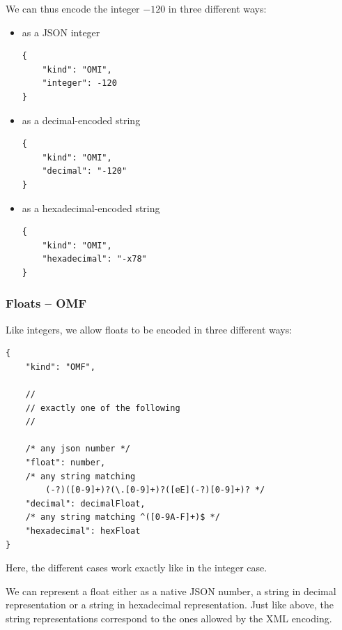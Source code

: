 We can thus encode the integer $-120$ in three different ways:
\begin{itemize}
    \item as a JSON integer
\\\begin{minipage}{\linewidth}\begin{lstlisting}
{
    "kind": "OMI",
    "integer": -120
}
\end{lstlisting}\end{minipage}
    \item as a decimal-encoded string
\\\begin{minipage}{\linewidth}\begin{lstlisting}
{
    "kind": "OMI",
    "decimal": "-120"
}
\end{lstlisting}\end{minipage}
    \item as a hexadecimal-encoded string
\\\begin{minipage}{\linewidth}\begin{lstlisting}
{
    "kind": "OMI",
    "hexadecimal": "-x78"
}
\end{lstlisting}\end{minipage}
\end{itemize}

\subsubsection{Floats -- OMF}

Like integers, we allow floats to be encoded in three different ways:
\\\begin{minipage}{\linewidth}\begin{lstlisting}
{
    "kind": "OMF",

    //
    // exactly one of the following
    //

    /* any json number */
    "float": number,
    /* any string matching 
        (-?)([0-9]+)?(\.[0-9]+)?([eE](-?)[0-9]+)? */
    "decimal": decimalFloat,
    /* any string matching ^([0-9A-F]+)$ */
    "hexadecimal": hexFloat 
}
\end{lstlisting}\end{minipage}

Here, the different cases work exactly like in the integer case. 

We can represent a float either as a native JSON number, a string in decimal representation or a string in hexadecimal representation. 
Just like above, the string representations correspond to the ones allowed by the XML encoding. 

